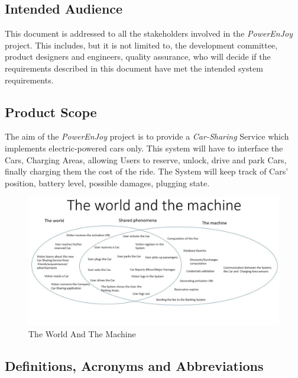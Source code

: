 \subsection{Intended Audience}
This document is addressed to all the stakeholders involved in the \emph{PowerEnJoy} project. This includes, but it is not limited to, the development committee, product designers and engineers, quality assurance, who will decide if the requirements described in this document have met the intended system requirements.

\subsection{Product Scope}
The aim of the \emph{PowerEnJoy} project is to provide a \textit{Car-Sharing} Service which implements electric-powered cars only.
This system will have to interface the Cars, Charging Areas, allowing Users to reserve, unlock, drive and park Cars, finally charging them the cost of the ride. 
The System will keep track of Cars' position, battery level, possible damages, plugging state.

\begin{figure}[!htbp]
\centering
\includegraphics[width=\linewidth,keepaspectratio]{../The_world_and_the_machine.jpg}
\caption{The World And The Machine}
\end{figure}
\FloatBarrier

\subsection{Definitions, Acronyms and Abbreviations}
